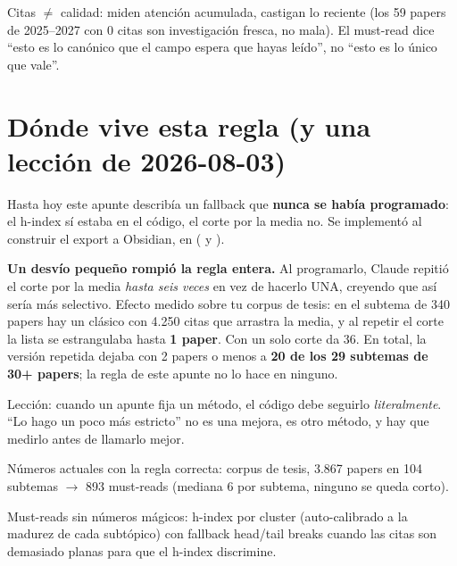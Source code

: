 \documentclass[11pt,a4paper]{article}
\begin{document}
\begin{ojo}
Citas $\neq$ calidad: miden atención acumulada, castigan lo reciente (los 59 papers de
2025--2027 con 0 citas son investigación fresca, no mala). El must-read dice ``esto es
lo canónico que el campo espera que hayas leído'', no ``esto es lo único que vale''.
\end{ojo}

\section{Dónde vive esta regla (y una lección de 2026-08-03)}

Hasta hoy este apunte describía un fallback que \textbf{nunca se había programado}: el
h-index sí estaba en el código, el corte por la media no. Se implementó al construir el
export a Obsidian, en  ( y
).

\begin{ojo}
\textbf{Un desvío pequeño rompió la regla entera.} Al programarlo, Claude repitió el corte
por la media \emph{hasta seis veces} en vez de hacerlo UNA, creyendo que así sería más
selectivo. Efecto medido sobre tu corpus de tesis: en el subtema de 340 papers hay un
clásico con 4.250 citas que arrastra la media, y al repetir el corte la lista se
estrangulaba hasta \textbf{1 paper}. Con un solo corte da 36. En total, la versión repetida
dejaba con 2 papers o menos a \textbf{20 de los 29 subtemas de 30+ papers}; la regla de
este apunte no lo hace en ninguno.

Lección: cuando un apunte fija un método, el código debe seguirlo \emph{literalmente}.
``Lo hago un poco más estricto'' no es una mejora, es otro método, y hay que medirlo
antes de llamarlo mejor.
\end{ojo}

Números actuales con la regla correcta: corpus de tesis, 3.867 papers en 104 subtemas
$\rightarrow$ 893 must-reads (mediana 6 por subtema, ninguno se queda corto).

\begin{resumen}
Must-reads sin números mágicos: h-index por cluster (auto-calibrado a la madurez de cada
subtópico) con fallback head/tail breaks cuando las citas son demasiado planas para que
el h-index discrimine.
\end{resumen}
\clearpage
{}
{}
\end{document}
